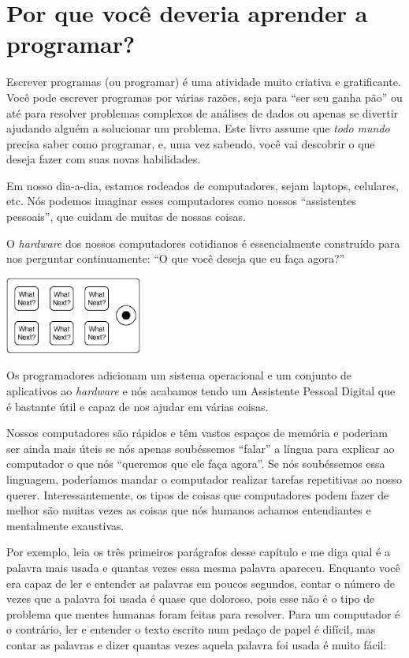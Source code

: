 
\chapter{Por que você deveria aprender a programar?} %

Escrever programas (ou programar) é uma atividade muito criativa e gratificante. Você pode escrever programas por várias razões, seja para ``ser seu ganha pão'' ou até para resolver problemas complexos de análises de dados ou apenas se divertir ajudando alguém a solucionar um problema. 
Este livro assume que \emph{todo mundo} precisa saber como programar, e, uma vez  sabendo, você vai descobrir o que deseja fazer com suas novas habilidades.

Em nosso dia-a-dia, estamos rodeados de computadores, sejam laptops, celulares, etc. Nós podemos imaginar esses computadores como nossos ``assistentes pessoais'', que cuidam de muitas de nossas coisas.

O \emph{hardware} dos nossos computadores cotidianos é essencialmente construído para nos perguntar continuamente: ``O que você deseja que eu faça agora?'' 

\centerline{\includegraphics[height=1.00in]{figs2/pda.eps}}

Os programadores adicionam um sistema operacional e um conjunto de aplicativos ao \emph{hardware} e nós acabamos tendo um Assistente Pessoal Digital que é bastante útil e capaz de nos ajudar em várias coisas. 

Nossos computadores são rápidos e têm vastos espaços de memória e poderiam ser ainda mais úteis se nós {apenas} soubéssemos ``falar'' a língua para explicar ao computador o que nós ``queremos que ele faça agora''. Se nós soubéssemos essa linguagem, poderíamos mandar o computador realizar tarefas repetitivas ao nosso querer. Interessantemente, os tipos de coisas que computadores podem fazer de melhor são muitas vezes as coisas que nós humanos achamos entendiantes e mentalmente exaustivas.

Por exemplo, leia os três primeiros parágrafos desse capítulo e me diga qual é a palavra mais usada e quantas vezes essa mesma palavra apareceu. Enquanto você era capaz de ler e entender as palavras em poucos segundos, contar o número de vezes que a palavra foi usada é quase que doloroso, pois esse não é o tipo de problema que mentes humanas foram feitas para resolver. Para um computador é o contrário, ler e entender o texto escrito num pedaço de papel é difícil, mas contar as palavras e dizer quantas vezes aquela palavra foi usada é muito fácil:

